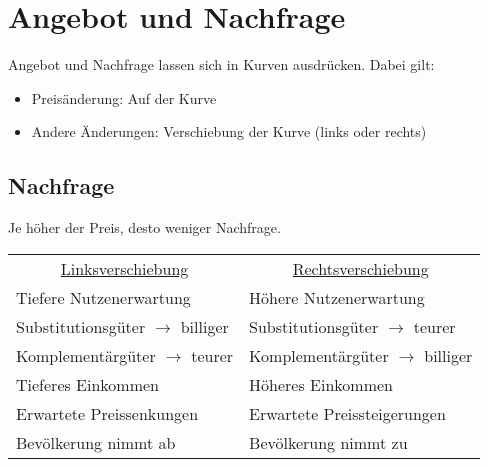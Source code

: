 \section{Angebot und Nachfrage}
Angebot und Nachfrage lassen sich in Kurven ausdrücken. Dabei gilt:
\begin{itemize}\itemsep0em
	\item Preisänderung: Auf der Kurve
	\item Andere Änderungen: Verschiebung der Kurve (links oder rechts)
\end{itemize}

\subsection{Nachfrage}

Je höher der Preis, desto weniger Nachfrage.

\begin{center}
\end{center}

 \begin{tabular}{@{}p{}%
				@{}p{}}
	\multicolumn{1}{c}{\underline{Linksverschiebung}} & \multicolumn{1}{c}{\underline{Rechtsverschiebung}}\\
	Tiefere Nutzenerwartung & Höhere Nutzenerwartung \\
	Substitutionsgüter $\rightarrow$ billiger & Substitutionsgüter $\rightarrow$ teurer \\
	Komplementärgüter $\rightarrow$ teurer & Komplementärgüter $\rightarrow$ billiger \\
	Tieferes Einkommen & Höheres Einkommen \\
	Erwartete Preissenkungen & Erwartete Preissteigerungen \\
	Bevölkerung nimmt ab & Bevölkerung nimmt zu \\
\end{tabular}

